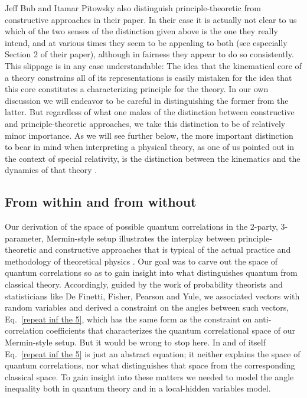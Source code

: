 Jeff Bub and Itamar Pitowsky also distinguish principle-theoretic from constructive approaches in their \citeyear{Bub and Pitowsky 2010} paper. In their case it is actually not clear to us which of the two senses of the distinction given above is the one they really intend, and at various times they seem to be appealing to both (see especially Section 2 of their paper), although in fairness they appear to do so consistently. This slippage is in any case understandable: The idea that the kinematical core of a theory constrains all of its representations is easily mistaken for the idea that this core constitutes a characterizing principle for the theory. In our own discussion we will endeavor to be careful in distinguishing the former from the latter. But regardless of what one makes of the distinction between constructive and principle-theoretic approaches, we take this distinction to be of relatively minor importance. As we will see further below, the more important distinction to bear in mind when interpreting a physical theory, as one of us pointed out in the context of special relativity, is the distinction between the kinematics and the dynamics of that theory \citep[p.\ 38]{Janssen 2009}.

\subsection{From within and from without}
\label{4.2}

Our derivation of the space of possible quantum correlations in the 2-party, 3-parameter, Mermin-style setup illustrates the interplay between principle-theoretic and constructive approaches that is typical of the actual practice and methodology of theoretical physics \citep[compare, e.g.,][]{Sainz et al 2018}. Our goal was to carve out the space of quantum correlations so as to gain insight into what distinguishes quantum from classical theory. Accordingly, guided by the work of probability theorists and statisticians like De Finetti, Fisher, Pearson and Yule, we associated vectors with random variables and derived a constraint on the angles between such vectors, Eq.\ \eqref{repeat inf the 5}, which has the same form as the constraint on anti-correlation coefficients that characterizes the quantum correlational space of our Mermin-style setup. But it would be wrong to stop here. In and of itself Eq.\ \eqref{repeat inf the 5} is just an abstract equation; it neither explains the space of quantum correlations, nor what distinguishes that space from the corresponding classical space. To gain insight into these matters we needed to model the angle inequality both in quantum theory and in a local-hidden variables model.

